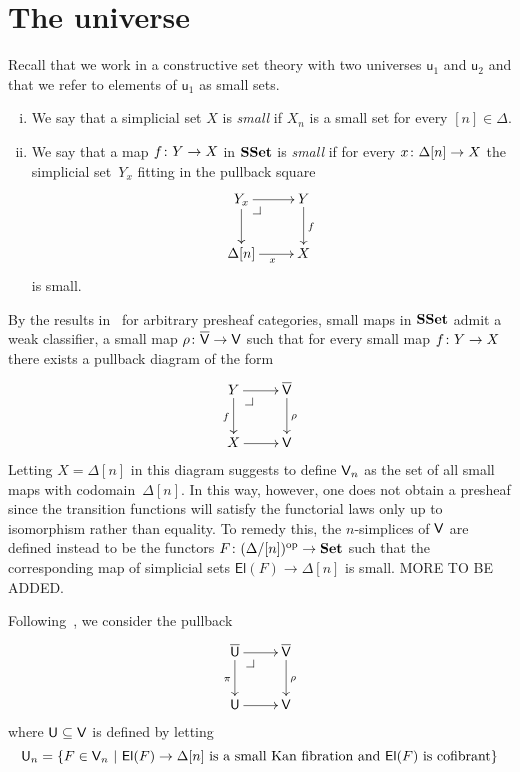 \documentclass[reqno,10pt,a4paper,oneside,draft]{amsart}
\begin{document}
\newpage

\section{The universe}

Recall that we work in a constructive set theory with two universes $\mathsf{u}_1$ and $\mathsf{u}_2$
and that we refer to elements of $\mathsf{u}_1$ as small sets. 


\begin{definition} \hfill 
\label{thm:small}
\begin{enumerate}[(i)]
\item We say that a simplicial set $X$ is \emph{small}  if $X_n$ is a small set for every $[n] \in \Delta$. 
\item We say that a map $f \colon Y \to X$ in $\mathbf{SSet}$ is \emph{small} if for every $x \colon \Delta[n] 
\to X$ the simplicial set~$Y_x$ fitting in the pullback square
\[
\xymatrix{
Y_x \ar[r] \ar[d] \drpullback & Y \ar[d]^{f} \\
\Delta[n] \ar[r]_x & X }
\]
is small.
\end{enumerate}
\end{definition} 

By the results in~\cite{hofmann-streicher-universes} for arbitrary presheaf categories, small maps in
 $\mathbf{SSet}$ admit a weak classifier, \ie a small map $\rho \colon \overline{\mathsf{V}} \to \mathsf{V}$ such 
that for every small map $f \colon Y \to X$ there exists  a pullback diagram of the form
\[
\xymatrix{
Y \ar[r] \ar[d]_f \drpullback  & \VV \ar[d]^\rho \\
X \ar[r] & \V }
\]
Letting $X = \Delta[n]$ in this diagram suggests to define $\mathsf{V}_n$ as the set of all small maps with codomain~$\Delta[n]$. In this way, however, one does not obtain a presheaf since the transition functions
will satisfy the functorial laws only up to isomorphism rather than equality. To remedy this, the $n$-simplices of $\mathsf{V}$ are defined instead to be the functors $F \colon (\Delta/[n])^{\operatorname{op}} \to \mathbf{Set}$ such that 
the corresponding map of simplicial sets $ \mathsf{El}(F) \to \Delta[n]$ is small. MORE TO BE ADDED.

\medskip

Following~\cite{cisinski-univalence,voevodsky-simplicial-model}, we consider the pullback 
\[
\xymatrix{
\UU \ar[r] \ar[d]_\pi \drpullback  & \VV \ar[d]^\rho \\
\U \ar[r] & \V }
\]
where $\mathsf{U} \subseteq \mathsf{V}$ is defined by letting 
\[
\mathsf{U}_n = \{ F \in \mathsf{V}_n \ | \ \mathsf{El}(F) \to \Delta[n] \text{ is a small Kan fibration and $\mathsf{El}(F)$ is cofibrant} \}
\]
\end{document}
